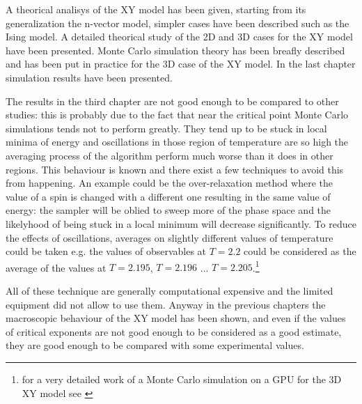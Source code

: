 A theorical analisys of the XY model has been given, starting from its
generalization the n-vector model, simpler cases have been described such as the
Ising model. A detailed theorical study of the 2D and 3D cases for the XY model have been
presented. Monte Carlo simulation theory has been breafly described and has been
put in practice for the 3D case of the XY model. In the last chapter simulation results
have been presented.

The results in the third chapter are not good enough to be compared to other
studies: this is probably due to the fact that near the critical point Monte
Carlo simulations tends not to perform greatly. They tend up to be stuck in
local minima of energy and oscillations in those region of temperature are so high
the averaging process of the algorithm perform much worse than it does in other
regions. This behaviour is known and there exist a few techniques to avoid this
from happening. An example could be the over-relaxation method where the value of
a spin is changed with a different one resulting in the same value of energy: the
sampler will be oblied to sweep more of the phase space and the likelyhood of 
being stuck in a local minimum will decrease significantly. To reduce the
effects of oscillations, averages on slightly different values of temperature
could be taken e.g. the values of observables at $T=2.2$ could be considered 
as the average of the values at $T = 2.195$, $T=2.196$ ... $T=2.205$.\footnote{for
a very detailed work of a Monte Carlo simulation on a GPU for the 3D XY model 
see \cite{Lan}}

All of these technique are generally computational expensive and the limited
equipment did not allow to use them. Anyway in the previous chapters the 
macroscopic behaviour of the XY model has been shown, and even if the values of
critical exponents are not good enough to be considered as a good estimate, 
they are good enough to be compared with some experimental values.


